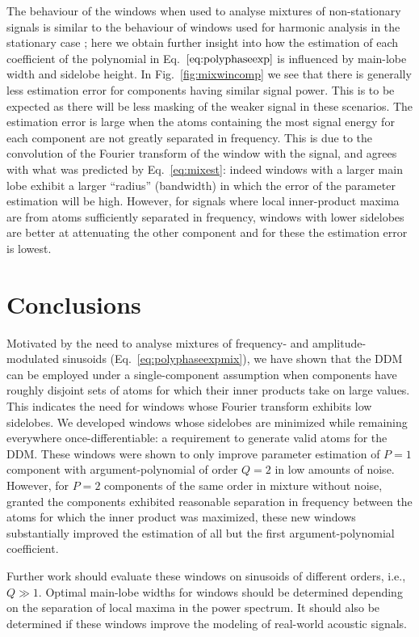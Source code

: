 \documentclass[twoside,a4paper]{article}
\begin{document}
The behaviour of the windows when used to analyse mixtures of non-stationary
signals is similar to the behaviour of windows used for harmonic analysis in the
stationary case \cite{harris1978use}; here we obtain further insight into how
the estimation of each coefficient of the polynomial in
Eq.~$\ref{eq:polyphaseexp}$ is influenced by main-lobe width and sidelobe
height. In Fig.~\ref{fig:mixwincomp} we see that there is generally less
estimation error for components having similar signal power. This is to be
expected as there will be less masking of the weaker signal in these scenarios.
The estimation error is large when the atoms containing the most signal energy
for each component are not greatly separated in frequency.  This is due to the
convolution of the Fourier transform of the window with the signal, and agrees
with what was predicted by Eq.~\ref{eq:mixest}: indeed windows with a larger
main lobe exhibit a larger ``radius'' (bandwidth) in which the error of the
parameter estimation will be high.  However, for signals where local
inner-product maxima are from atoms sufficiently separated in frequency, windows
with lower sidelobes are better at attenuating the other component and for these
the estimation error is lowest.

\section{Conclusions}

Motivated by the need to analyse mixtures of frequency- and
am\-pli\-tude-mod\-u\-lat\-ed
sinusoids (Eq.~\ref{eq:polyphaseexpmix}), we have shown that the DDM can be
employed under a single-component
assumption when components have roughly disjoint sets of atoms for which their
inner products take on large values. This indicates the need for windows whose
Fourier transform exhibits low sidelobes. We developed windows whose sidelobes
are minimized while remaining everywhere once-differentiable: a requirement to
generate valid atoms for the DDM. These windows were shown to only improve parameter
estimation of $P=1$ component with argument-polynomial of order $Q=2$ in low
amounts of noise. However, for $P=2$ components of the same order in mixture without
noise, granted the components
exhibited reasonable separation in frequency between the atoms for which the
inner product was maximized, these new windows substantially improved the
estimation of all but the first argument-polynomial coefficient.

Further work should evaluate these windows on sinusoids of different orders,
i.e., $Q \gg 1$. Optimal main-lobe widths for windows should be determined
depending on the separation of local maxima in the power spectrum. It should
also be determined if these windows improve the modeling of real-world acoustic
signals.




\end{document}
